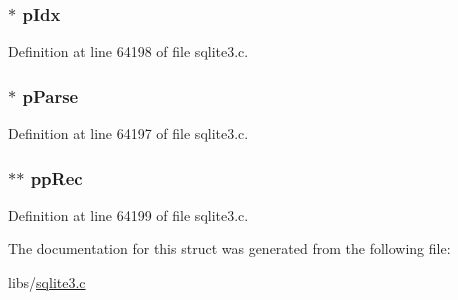 \hypertarget{struct_value_new_stat4_ctx_a0a616595a4d7fb288679febde269dd1e}{}
\subsubsection[{p\+Idx}]{$\ast$ p\+Idx}\label{struct_value_new_stat4_ctx_a0a616595a4d7fb288679febde269dd1e}


Definition at line 64198 of file sqlite3.\+c.

\hypertarget{struct_value_new_stat4_ctx_ac700bf257b32cd7e491fde90a081379d}{}
\subsubsection[{p\+Parse}]{$\ast$ p\+Parse}\label{struct_value_new_stat4_ctx_ac700bf257b32cd7e491fde90a081379d}


Definition at line 64197 of file sqlite3.\+c.

\hypertarget{struct_value_new_stat4_ctx_a938bf6e932b7a4329fedc87206d3efe5}{}
\subsubsection[{pp\+Rec}]{$\ast$$\ast$ pp\+Rec}\label{struct_value_new_stat4_ctx_a938bf6e932b7a4329fedc87206d3efe5}


Definition at line 64199 of file sqlite3.\+c.



The documentation for this struct was generated from the following file\+:\begin{DoxyCompactItemize}
\item 
libs/\hyperlink{sqlite3_8c}{sqlite3.\+c}\end{DoxyCompactItemize}

